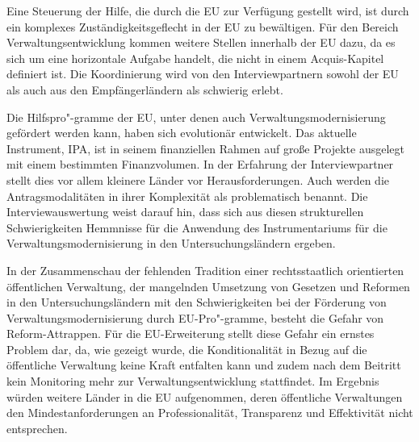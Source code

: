Eine Steuerung der Hilfe, die durch die EU zur Verfügung gestellt wird, ist durch ein komplexes Zuständigkeitsgeflecht in der EU zu bewältigen. Für den Bereich Verwaltungsentwicklung kommen weitere Stellen innerhalb der EU dazu, da es sich um eine horizontale Aufgabe handelt, die nicht in einem Acquis-Kapitel definiert ist. Die Koordinierung wird von den Interviewpartnern sowohl der EU als auch aus den Empfängerländern als schwierig erlebt. \par
Die Hilfspro"-gramme der EU, unter denen auch Verwaltungsmodernisierung gefördert werden kann, haben sich evolutionär entwickelt. Das aktuelle Instrument, IPA, ist in seinem finanziellen Rahmen auf große Projekte ausgelegt mit einem bestimmten Finanzvolumen. In der Erfahrung der Interviewpartner stellt dies vor allem kleinere Länder vor Herausforderungen. Auch werden die Antragsmodalitäten in ihrer Komplexität als problematisch benannt. Die Interviewauswertung weist darauf hin, dass sich aus diesen strukturellen Schwierigkeiten Hemmnisse für die Anwendung des Instrumentariums für die Verwaltungsmodernisierung in den Untersuchungsländern ergeben. \par
In der Zusammenschau der fehlenden Tradition einer rechtsstaatlich orientierten öffentlichen Verwaltung, der mangelnden Umsetzung von Gesetzen und Reformen in den Untersuchungsländern mit den Schwierigkeiten bei der Förderung von Verwaltungsmodernisierung durch EU-Pro"-gramme, besteht die Gefahr von Reform-Attrappen. Für die EU-Erweiterung stellt diese Gefahr ein ernstes Problem dar, da, wie gezeigt wurde, die Konditionalität in Bezug auf die öffentliche Verwaltung keine Kraft entfalten kann und zudem nach dem Beitritt kein Monitoring mehr zur Verwaltungsentwicklung stattfindet. Im Ergebnis würden weitere Länder in die EU aufgenommen, deren öffentliche Verwaltungen den Mindestanforderungen an Professionalität, Transparenz und Effektivität nicht entsprechen. 

